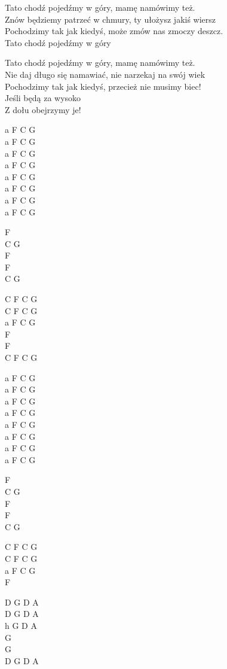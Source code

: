\begin{text}
    Tato chodź pojedźmy w góry, mamę namówimy też.\\
    Znów będziemy patrzeć w chmury, ty ułożysz jakiś wiersz\\
    Pochodzimy tak jak kiedyś, może zmów nas zmoczy deszcz.\\
    Tato chodź pojedźmy w góry

    Tato chodź pojedźmy w góry, mamę namówimy też. \\
    Nie daj długo się namawiać, nie narzekaj na swój wiek \\
    Pochodzimy tak jak kiedyś, przecież nie musimy biec!\\
    Jeśli będą za wysoko\\
    Z dołu obejrzymy je!


\end{text}
\begin{chord}
    a F C G\\
    a F C G\\
    a F C G\\
    a F C G\\
    a F C G\\
    a F C G\\
    a F C G\\
    a F C G

    F\\
    C G\\
    F\\
    F\\
    C G


    C F C G\\
    C F C G\\
    a F C G\\
    F\\
    F\\
    C F C G

    a F C G\\
    a F C G\\
    a F C G\\
    a F C G\\
    a F C G\\
    a F C G\\
    a F C G\\
    a F C G

    F\\
    C G\\
    F\\
    F\\
    C G

    C F C G\\
    C F C G\\
    a F C G\\
	F

    D G D A\\
    D G D A\\
    h G D A\\
    G\\
    G\\
    D G D A

\end{chord}